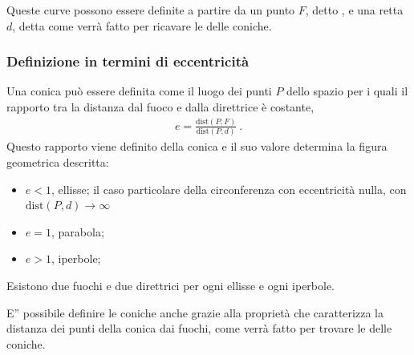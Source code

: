 \documentclass[letterpaper,10pt,italian]{jupyterBook}
\begin{document}
\sphinxAtStartPar
Queste curve possono essere definite a partire da un punto \(F\), detto , e una retta \(d\), detta  come verrà fatto per ricavare le {\hyperref[\detokenize{ch/analytic_geometry/analytic_geometry_2d/conics-polar:geometry-analytic-2d-conics-polar}]{}} delle coniche.
\subsubsection*{Definizione in termini di eccentricità}

\sphinxAtStartPar
Una conica può essere definita come il luogo dei punti \(P\) dello spazio per i quali il rapporto tra la distanza dal fuoco e dalla direttrice è costante,
\begin{equation*}
\begin{split}e = \frac{\text{dist}(P,F)}{\text{dist}(P,d)} \ .\end{split}
\end{equation*}
\sphinxAtStartPar
Questo rapporto viene definito  della conica e il suo valore determina la figura geometrica descritta:
\begin{itemize}
\item {} 
\sphinxAtStartPar
\(e<1\), ellisse;
il caso particolare della circonferenza con eccentricità nulla, con \(\text{dist}(P,d) \rightarrow \infty\)

\item {} 
\sphinxAtStartPar
\(e=1\), parabola;

\item {} 
\sphinxAtStartPar
\(e>1\), iperbole;

\end{itemize}

\sphinxAtStartPar
Esistono due fuochi e due direttrici per ogni ellisse e ogni iperbole.

\sphinxAtStartPar
E” possibile definire le coniche anche grazie alla proprietà che caratterizza la distanza dei punti della conica dai fuochi, come verrà fatto per trovare le {\hyperref[\detokenize{ch/analytic_geometry/analytic_geometry_2d/conics-cartesian:geometry-analytic-2d-conics-cartesian}]{}} delle coniche.
\end{document}
